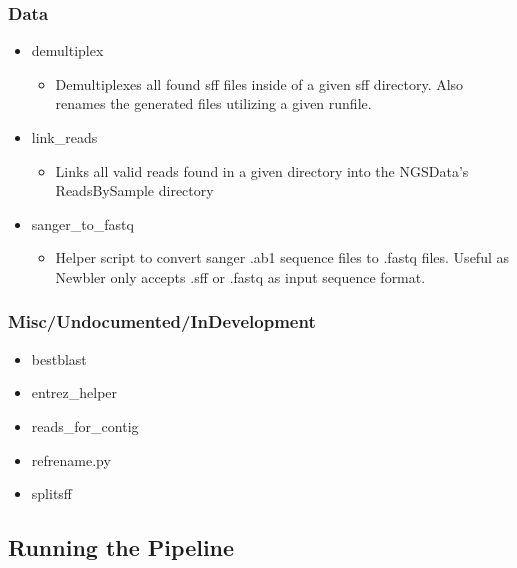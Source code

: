 \documentclass{article}
\begin{document}
\subsubsection{Data}
 \begin{itemize}
  \item demultiplex
   \begin{itemize}
    \item Demultiplexes all found sff files inside of a given sff directory. Also renames the generated files utilizing a given runfile.
   \end{itemize}
  \item link\_reads
   \begin{itemize}
    \item Links all valid reads found in a given directory into the NGSData's ReadsBySample directory
   \end{itemize}
  \item sanger\_to\_fastq
   \begin{itemize}
    \item Helper script to convert sanger .ab1 sequence files to .fastq files. Useful as Newbler only accepts .sff or .fastq as input sequence format.
   \end{itemize}
 \end{itemize}
\subsubsection{Misc/Undocumented/InDevelopment}
 \begin{itemize}
  \item bestblast
  \item entrez\_helper
  \item reads\_for\_contig
  \item refrename.py
  \item splitsff
 \end{itemize}

\subsection{Running the Pipeline}
\end{document}
